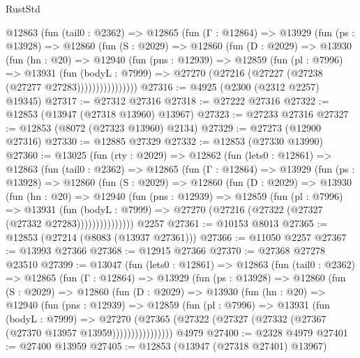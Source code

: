 \begin{lexlean}{RustStd}
\begin{coremodule}
        @12863
          (fun (tail0 : @2362) =>
          @12865
            (fun (Γ : @12864) =>
            @13929
              (fun (ps : @13928) =>
              @12860
                (fun (S : @2029) =>
                @12860
                  (fun (D : @2029) =>
                  @13930
                    (fun (hn : @20) =>
                    @12940
                      (fun (pns : @12939) =>
                      @12859
                        (fun (pl : @7996) =>
                        @13931
                          (fun (bodyL : @7999) =>
                          @27270 (@27216 (@27227 (@27238 (@27277 @27283))))))))))))))))
@27316 := @4925 (@2300 (@2312 @2257) @19345)
@27317 := @27312 @27316
@27318 := @27222 @27316
@27322 := @12853 (@13947 (@27318 @13960) @13967)
@27323 := @27233 @27316
@27327 := @12853 (@8072 (@27323 @13960) @2134)
@27329 := @27273 (@12900 @27316)
@27330 := @12885 @27329
@27332 := @12853 (@27330 @13990)
@27360 := @13025
    (fun (rty : @2029) =>
    @12862
      (fun (lets0 : @12861) =>
      @12863
        (fun (tail0 : @2362) =>
        @12865
          (fun (Γ : @12864) =>
          @13929
            (fun (ps : @13928) =>
            @12860
              (fun (S : @2029) =>
              @12860
                (fun (D : @2029) =>
                @13930
                  (fun (hn : @20) =>
                  @12940
                    (fun (pns : @12939) =>
                    @12859
                      (fun (pl : @7996) =>
                      @13931
                        (fun (bodyL : @7999) =>
                        @27270 (@27216 (@27322 (@27327 (@27332 @27283)))))))))))))))
    @2257
@27361 := @10153 @8013
@27365 := @12853 (@27214 (@8083 (@13937 @27361)))
@27366 := @11050 @2257
@27367 := @13993 @27366
@27368 := @12915 @27366
@27370 := @27368 @27278 @23510
@27399 := @13047
    (fun (lets0 : @12861) =>
    @12863
      (fun (tail0 : @2362) =>
      @12865
        (fun (Γ : @12864) =>
        @13929
          (fun (ps : @13928) =>
          @12860
            (fun (S : @2029) =>
            @12860
              (fun (D : @2029) =>
              @13930
                (fun (hn : @20) =>
                @12940
                  (fun (pns : @12939) =>
                  @12859
                    (fun (pl : @7996) =>
                    @13931
                      (fun (bodyL : @7999) =>
                      @27270
                        (@27365
                          (@27322 (@27327 (@27332 (@27367 (@27370 @13957 @13959))))))))))))))))
    @4979
@27400 := @2328 @4979
@27401 := @27400 @13959
@27405 := @12853 (@13947 (@27318 @27401) @13967)

\end{coremodule}
\end{lexlean}
